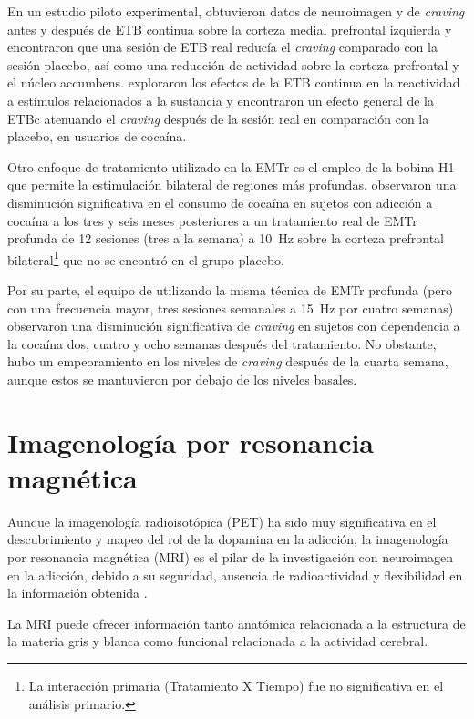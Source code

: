 En un estudio piloto experimental, \textcite{Hanlon2015} obtuvieron datos de neuroimagen y de \textit{craving} antes y después de ETB continua sobre la corteza medial prefrontal izquierda y encontraron que una sesión de ETB real reducía el \textit{craving} comparado con la sesión placebo, así como una reducción de actividad sobre la corteza prefrontal y el núcleo accumbens.
\textcite{Kearney-Ramos2018a} exploraron los efectos de la ETB continua en la reactividad a estímulos relacionados a la sustancia y encontraron un efecto general de la ETBc atenuando el \textit{craving} después de la sesión real en comparación con la placebo, en usuarios de cocaína. \par
Otro enfoque de tratamiento utilizado en la EMTr es el empleo de la bobina H1 que permite la estimulación bilateral de regiones más profundas.
\textcite{Bolloni2016} observaron una disminución significativa en el consumo de cocaína en sujetos con adicción a cocaína a los tres y seis meses posteriores a un tratamiento real de EMTr profunda de 12 sesiones (tres a la semana) a \SI{10}{\hertz} sobre la corteza prefrontal bilateral\footnote{La interacción primaria (Tratamiento X Tiempo) fue no significativa en el análisis primario.} que no se encontró en el grupo placebo.\par
Por su parte, el equipo de \textcite{Rapinesi2016} utilizando la misma técnica de EMTr profunda (pero con una frecuencia mayor, tres sesiones semanales a \SI{15}{\hertz} por cuatro semanas) observaron una disminución significativa de \textit{craving} en sujetos con dependencia a la cocaína dos, cuatro y ocho semanas después del tratamiento.
No obstante, hubo un empeoramiento en los niveles de \textit{craving} después de la cuarta semana, aunque estos se mantuvieron por debajo de los niveles basales.

\section{Imagenología por resonancia magnética}
Aunque la imagenología radioisotópica (PET) ha sido muy significativa en el descubrimiento y mapeo del rol de la dopamina en la adicción, la imagenología por resonancia magnética (MRI) es el pilar de la investigación con neuroimagen en la adicción, debido a su seguridad, ausencia de radioactividad y flexibilidad en la información obtenida \parencite{Suckling2017}. \par
La MRI puede ofrecer información tanto anatómica \textemdash{}relacionada a la estructura de la materia gris y blanca\textemdash{} como funcional \textemdash{}relacionada a la actividad cerebral.

